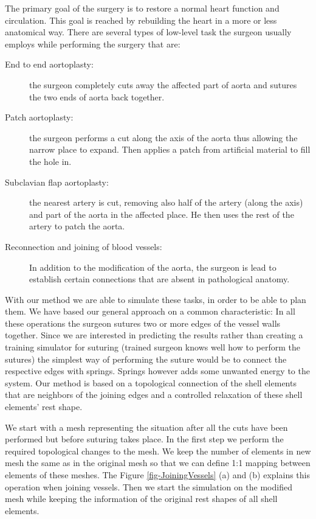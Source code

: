 The primary goal of the surgery is to restore a normal heart function and circulation.
This goal is reached by rebuilding the heart in a more or less anatomical way.
There are several types of low-level task the surgeon usually employs while
performing the surgery that are:

\begin{description}

  \item[End to end aortoplasty:] the surgeon completely cuts away the
    affected part of aorta and sutures the two ends of aorta back together.

  \item[Patch aortoplasty:] the surgeon performs a cut along the axis of
    the aorta thus allowing the narrow place to expand. Then applies a
    patch from artificial material to fill the hole in.

  \item[Subclavian flap aortoplasty:] the nearest artery is cut,
    removing also half of the artery (along the axis) and part of the
    aorta in the affected place. He then uses the rest of the artery to
    patch the aorta.
    
  \item[Reconnection and joining of blood vessels:] In addition to the modification of the aorta, the surgeon is lead to establish certain connections that are absent in pathological anatomy.

\end{description}

With our method we are able to simulate these tasks, in order to be able to plan them.
We have based our general approach on a common characteristic: In all these operations the surgeon sutures two or more edges of the vessel walls together.
Since we are interested in predicting the results rather than creating a training simulator for suturing (trained surgeon knows well how to perform the sutures) the simplest way of performing the suture would be to connect the respective edges with springs. 
Springs however adds some unwanted energy to the system. 
Our method is based on a topological connection of the shell elements that are neighbors of the joining edges and a controlled relaxation of these shell elements' rest shape.

We start with a mesh representing the situation after all the cuts have been performed but before suturing takes place. 
In the first step we perform the required topological changes to the mesh. We keep the number of elements in new mesh the same as in the original mesh so that we can define 1:1 mapping between elements of these meshes.
The Figure \ref{fig-JoiningVessels} (a) and (b) explains this operation when joining vessels. 
Then we start the simulation on the modified mesh while keeping the information of the original rest shapes of all shell elements. 

